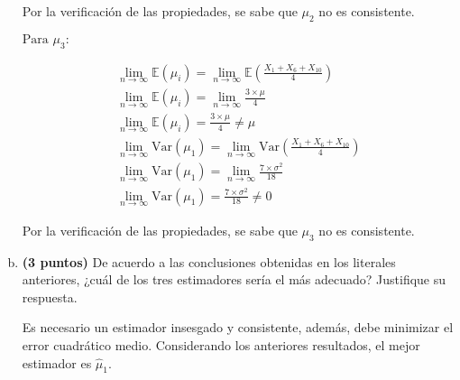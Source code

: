 \documentclass[../main.tex]{subfiles}
\begin{document}
\begin{enumerate}[(a)]
Por la verificación de las propiedades, se sabe que $\mu_2$ no es consistente.

$\text{Para } \mu_3:$

\begin{equation}
\begin{split}
\lim_{n\to\infty} \mathbb{E}(\mu_i) = \lim_{n\to\infty} \mathbb{E}\left( \frac{X_1 + X_6 + X_{10}}{4}\right) \\
\lim_{n\to\infty} \mathbb{E}(\mu_i) = \lim_{n\to\infty} \frac{3 \times \mu}{4} \\
\lim_{n\to\infty} \mathbb{E}(\mu_i) = \frac{3 \times \mu}{4} \neq \mu \\
\lim_{n\to\infty} \text{Var}(\mu_1) = \lim_{n\to\infty} \text{Var}\left( \frac{X_1 + X_6 + X_{10}}{4}\right) \\
\lim_{n\to\infty} \text{Var}(\mu_1) = \lim_{n\to\infty}\frac{7 \times \sigma ^2}{18} \\
\lim_{n\to\infty} \text{Var}(\mu_1) = \frac{7 \times \sigma ^2}{18} \neq 0
\end{split}
\end{equation}

Por la verificación de las propiedades, se sabe que $\mu_3$ no es consistente.

\item \textbf{(3 puntos)} De acuerdo a las conclusiones obtenidas en los literales anteriores, ¿cuál de los tres estimadores sería el más adecuado? Justifique su respuesta.

Es necesario un estimador insesgado y consistente, además, debe minimizar el error cuadrático medio. Considerando los anteriores resultados, el mejor estimador es $\hat{\mu}_1$.

\end{enumerate}
\end{document}

